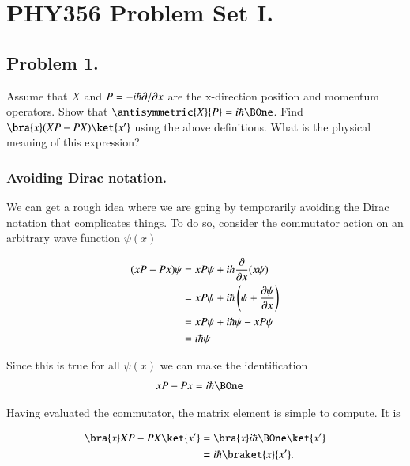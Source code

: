 %
%
%
\chapter{PHY356 Problem Set I.}
\label{chap:qmIproblemSet1}
{}
\date{Oct 7, 2010}

\beginArtNoToc

\section{Problem 1.}

Assume that $X$ and $P = -i \hbar {\partial {}}/{\partial {x}}$ are the x-direction position and momentum operators. Show that $\antisymmetric{X}{P}=i\hbar \BOne$. Find $\bra{x}(XP-PX)\ket{x'}$ using the above definitions. What is the physical meaning of this expression?

\subsection{Avoiding Dirac notation.}

We can get a rough idea where we are going by temporarily avoiding the Dirac notation that complicates things.  To do so, consider the commutator action on an arbitrary wave function $\psi(x)$

\begin{align*}
(x P - P x)\psi
&=
x P \psi + i\hbar \frac{\partial {}}{\partial {x}} (x \psi) \\
&=
x P \psi + i\hbar \left(\psi + \frac{\partial {\psi}}{\partial {x}} \right) \\
&=
x P \psi + i \hbar \psi - x P \psi \\
&=
i \hbar \psi
\end{align*}

Since this is true for all $\psi(x)$ we can make the identification
\begin{align}\label{eqn:qmIproblemSet1:1}
x P - P x &= i\hbar \BOne
\end{align}

Having evaluated the commutator, the matrix element is simple to compute.  It is

\begin{align*}
\bra{x} XP - PX \ket{x'}
&=
\bra{x} i \hbar \BOne \ket{x'} \\
&=
i \hbar \braket{x}{x'}.
\end{align*}

